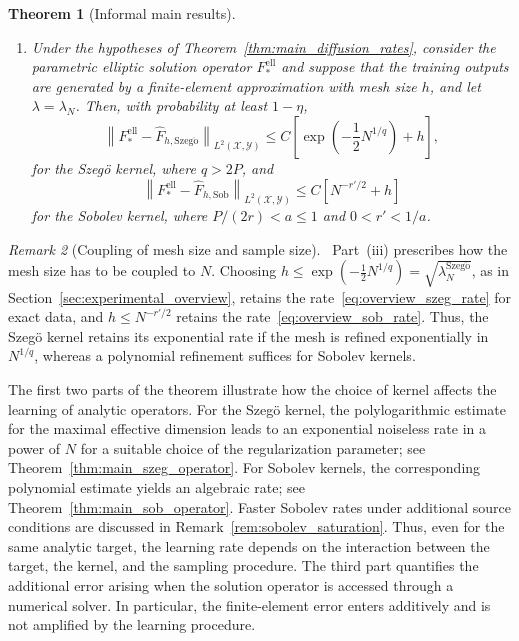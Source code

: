 \documentclass[11pt]{article}
\numberwithin{equation}{section}
\theoremstyle{plain}
\newtheorem{theorem}{Theorem}[section]
\theoremstyle{definition}
\theoremstyle{remark}
\newtheorem{remark}[theorem]{Remark}
\newcommand{\X}{\mathcal{X}}
\newcommand{\Y}{\mathcal{Y}}
\newcommand{\norm}[1]{\left\lVert#1\right\rVert}
\newcommand{\Fell}{F_{*}^{\mathrm{ell}}}
\begin{document}
\begin{theorem}[Informal main results]
\begin{enumerate}[label=(\roman*)]
\item Under the hypotheses of
Theorem~\ref{thm:main_diffusion_rates}, consider the parametric elliptic
solution operator $\Fell$ and suppose that the training outputs are generated
by a finite-element approximation with mesh size $h$, and let $\lambda=\lambda_N$. Then, with probability
at least $1-\eta$,
\begin{equation}
\norm{\Fell-\hat{F}_{h,\mathrm{Szeg\ddot{o}}}}_{L^2(\X,\Y)}
\leq
C\left[
\exp\left(-\frac{1}{2}N^{1/q}\right)
+
h
\right],
\label{eq:overview_pde_szeg_rate}
\end{equation}
for the Szegö kernel, where $q>2P$, and
\begin{equation}
\norm{\Fell-\hat{F}_{h,\mathrm{Sob}}}_{L^2(\X,\Y)}
\leq
C\left[
N^{-r'/2}
+
h
\right]
\label{eq:overview_pde_sob_rate}
\end{equation}
for the Sobolev kernel, where $P/(2r)<a\leq1$ and
$0<r'<1/a$.

\end{enumerate}
\end{theorem}

\begin{remark}[Coupling of mesh size and sample size]
\label{rem:coupling}\
Part~(iii) prescribes how the mesh size has to be coupled to $N$. Choosing
$h\leq\exp\left(-\frac12N^{1/q}\right)=\sqrt{\lambda_N^{\mathrm{Szeg\ddot{o}}}}$,
as in Section~\ref{sec:experimental_overview}, retains the
rate~\eqref{eq:overview_szeg_rate} for exact data, and
$h\leq N^{-r'/2}$ retains the rate~\eqref{eq:overview_sob_rate}.
Thus, the Szegö kernel retains its exponential rate if the mesh is
refined exponentially in $N^{1/q}$, whereas a polynomial refinement suffices
for Sobolev kernels.
\end{remark}

The first two parts of the theorem illustrate how the choice of kernel
affects the learning of analytic operators. For the Szegö kernel, the
polylogarithmic estimate for the maximal effective dimension leads to an
exponential noiseless rate in a  power of $N$
for a suitable choice of the regularization parameter; see
Theorem~\ref{thm:main_szeg_operator}. For Sobolev kernels, the corresponding
polynomial estimate yields an algebraic rate; see
Theorem~\ref{thm:main_sob_operator}. Faster Sobolev rates under additional source conditions are
discussed in Remark~\ref{rem:sobolev_saturation}. Thus, even for
the same analytic target, the learning rate depends on the interaction between
the target, the kernel, and the sampling procedure. The third part quantifies
the additional error arising when the solution operator is accessed through a
numerical solver. In particular, the finite-element error enters
additively and is not amplified by the learning procedure.
\end{document}
